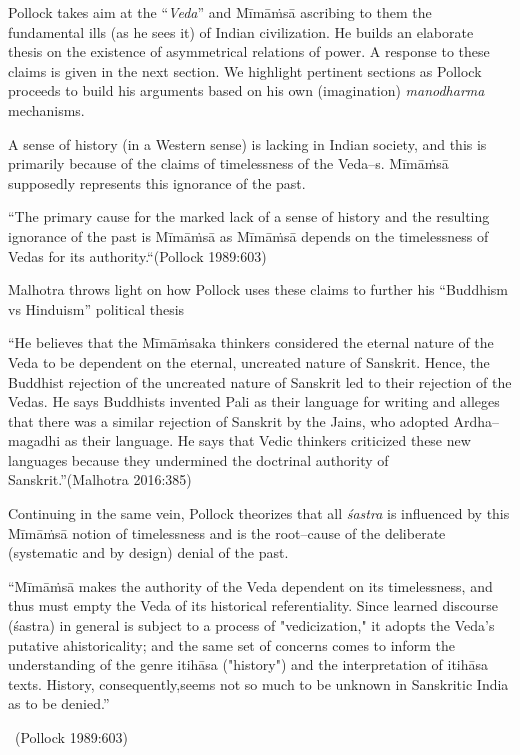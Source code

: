 Pollock takes aim at the “\textit{Veda}” and Mīmāṁsā ascribing to them the fundamental ills (as he sees it) of Indian civilization. He builds an elaborate thesis on the existence of asymmetrical relations of power. A response to these claims is given in the next section. We highlight pertinent sections as Pollock proceeds to build his arguments based on his own (imagination) \textit{manodharma} mechanisms.

A sense of history (in a Western sense) is lacking in Indian society, and this is primarily because of the claims of timelessness of the Veda–s. Mīmāṁsā supposedly represents this ignorance of the past.

\begin{myquote}
“The primary cause for the marked lack of a sense of history and the resulting ignorance of the past is Mīmāṁsā as Mīmāṁsā depends on the timelessness of Vedas for its authority.“\hfill (Pollock 1989:603)
\end{myquote}

Malhotra throws light on how Pollock uses these claims to further his “Buddhism vs Hinduism” political thesis

\begin{myquote}
“He believes that the Mīmāṁsaka thinkers considered the eternal nature of the Veda to be dependent on the eternal, uncreated nature of Sanskrit. Hence, the Buddhist rejection of the uncreated nature of Sanskrit led to their rejection of the Vedas. He says Buddhists invented Pali as their language for writing and alleges that there was a similar rejection of Sanskrit by the Jains, who adopted Ardha–magadhi as their language. He says that Vedic thinkers criticized these new languages because they undermined the doctrinal authority of Sanskrit.”\hfill (Malhotra 2016:385)
\end{myquote}

Continuing in the same vein, Pollock theorizes that all \textit{śastra} is influenced by this Mīmāṁsā notion of timelessness and is the root–cause of the deliberate (systematic and by design) denial of the past.

\begin{myquote}
“Mīmāṁsā makes the authority of the Veda dependent on its timelessness, and thus must empty the Veda of its historical referentiality. Since learned discourse (śastra) in general is subject to a process of "vedicization," it adopts the Veda's putative ahistoricality; and the same set of concerns comes to inform the understanding of the genre itihāsa ("history") and the interpretation of itihāsa texts. History, consequently,\break seems not so much to be unknown in Sanskritic India as to be denied.”

~\hfill (Pollock 1989:603)
\end{myquote}


